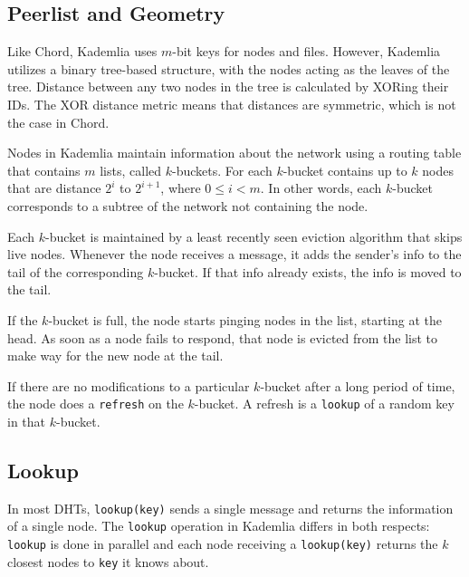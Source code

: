 
\subsection*{Peerlist and Geometry}
Like Chord, Kademlia uses $m$-bit keys for nodes and files.
However, Kademlia utilizes a binary tree-based structure, with the nodes acting as the leaves of the tree.
Distance between any two nodes in the tree  is calculated by XORing their IDs.
The XOR distance metric means that distances are symmetric, which is not the case in Chord.


Nodes in Kademlia maintain information about the network using a routing table that contains  $m$ lists, called $k$-buckets.
For each $k$-bucket contains up to $k$ nodes that are distance $2^i$ to $2^{i+1}$, where $0 \leq i < m$.
In other words, each $k$-bucket corresponds to a subtree of the network not containing the node.

Each $k$-bucket is maintained by a least recently seen eviction algorithm that skips live nodes.
Whenever the node receives a message, it adds the sender's info to the tail of the corresponding $k$-bucket.
If that info already exists, the info is moved to the tail.

If the $k$-bucket is full, the node starts pinging nodes in the list, starting at the head.
As soon as a node fails to respond, that node is evicted from the list to make way for the new node at the tail.

If there are no modifications to a particular $k$-bucket after a long period of time, the node does a \texttt{refresh} on the $k$-bucket.
A refresh is a \texttt{lookup} of a random key in that $k$-bucket.



\subsection*{Lookup}
In most DHTs, \texttt{lookup(key)} sends a single message and returns the information  of a single node.
The \texttt{lookup} operation in Kademlia differs in both respects:  \texttt{lookup} is done in parallel and each node receiving  a \texttt{lookup(key)} returns the $k$ closest nodes to \texttt{key} it knows about.


